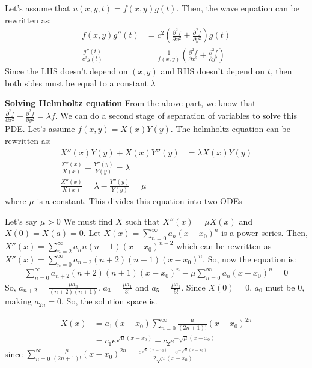 \documentclass[12pt]{article}
\begin{document}
Let's assume that $u(x, y, t) = f(x, y) g(t)$. Then, the wave equation can be rewritten as:
\begin{align*}
    f(x, y)g''(t) &= c^2\left(\frac{\partial^2 f}{\partial x^2} + \frac{\partial^2 f}{\partial y^2}\right)g(t) \\
    \frac{g''(t)}{c^2 g(t)} &= \frac{1}{f(x, y)}\left(\frac{\partial^2 f}{\partial x^2} + \frac{\partial^2 f}{\partial y^2}\right)
\end{align*}
Since the LHS doesn't depend on $(x, y)$ and RHS doesn't depend on $t$, then both sides must be equal to a constant $\lambda$

\textbf{Solving Helmholtz equation}
From the above part, we know that $\frac{\partial^2 f}{\partial x^2} + \frac{\partial^2 f}{\partial y^2} = \lambda f$. We can do a second stage of separation of variables to solve this PDE. Let's assume $f(x, y) = X(x)Y(y)$. The helmholtz equation can be rewritten as:
\begin{align*}
    X''(x)Y(y) + X(x)Y''(y) &= \lambda X(x)Y(y) \\
    \frac{X''(x)}{X(x)} + \frac{Y''(y)}{Y(y)} = \lambda \\
    \frac{X''(x)}{X(x)} = \lambda - \frac{Y''(y)}{Y(y)} = \mu
\end{align*}
where $\mu$ is a constant. This divides this equation into two ODEs

Let's say $\mu > 0$
We must find $X$ such that $X''(x) = \mu X(x)$ and $X(0) = X(a) = 0$. Let $X(x) = \sum_{n = 0}^{\infty} a_n(x - x_0)^n$ is a power series. Then,
$X''(x) = \sum_{n= 2}^{\infty}a_{n}n(n- 1)(x - x_0)^{n - 2}$ which can be rewritten as $X''(x) = \sum_{n= 0}^{\infty}a_{n + 2}(n + 2)(n + 1)(x - x_0)^{n}$. So, now the equation is:
\begin{align*}
    \sum_{n= 0}^{\infty}a_{n + 2}(n + 2)(n + 1)(x - x_0)^{n} - \mu \sum_{n = 0}^{\infty} a_n(x - x_0)^n = 0
\end{align*}
So, $a_{n + 2} = \frac{\mu a_n}{(n + 2)(n + 1)}$. $a_3  = \frac{\mu a_1}{3!}$ and $a_5 = \frac{\mu a_1}{5!}$. Since $X(0) = 0$, $a_0$ must be 0, making $a_{2n} = 0$. So, the solution space is.

\begin{align*}
    X(x) &= a_1(x - x_0)\sum_{n = 0}^{\infty}\frac{\mu}{(2n + 1)!}(x - x_0)^{2n} \\
    &= c_1 e^{\sqrt{\mu}(x - x_0)} + c_2 e^{-\sqrt{\mu}(x - x_0)}
\end{align*}
since $\sum_{n = 0}^{\infty}\frac{\mu}{(2n + 1)!}(x - x_0)^{2n} = \frac{ e^{\sqrt{\mu}(x - x_0)} - e^{-\sqrt{\mu}(x - x_0)}}{2\sqrt{\mu}(x - x_0)}$
\end{document}
